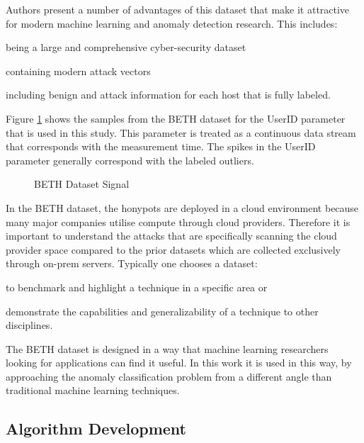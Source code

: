 Authors \cite{beth-dataset} present a number of advantages of this dataset that make it attractive for modern machine learning and anomaly detection research. This includes:
\begin{inlinelist}
    \item being a large and comprehensive cyber-security dataset
    \item containing modern attack vectors
    \item including benign and attack information for each host that is fully labeled.
\end{inlinelist}

Figure \ref{fig:beth_userid_all} shows the samples from the BETH dataset for the UserID parameter that is used in this study. This parameter is treated as a continuous data stream that corresponds with the measurement time. The spikes in the UserID parameter generally correspond with the labeled outliers.

\begin{figure}[H]
    
    \caption{BETH Dataset Signal}
    \label{fig:beth_userid_all}
\end{figure}

In the BETH dataset, the honypots are deployed in a cloud environment because many major companies utilise compute through cloud providers. Therefore it is important to understand the attacks that are specifically scanning the cloud provider space compared to the prior datasets which are collected exclusively through on-prem servers. Typically one chooses a dataset:
\begin{inlinelist}
    \item to benchmark and highlight a technique in a specific area or
    \item demonstrate the capabilities and generalizability of a technique to other disciplines.
\end{inlinelist}
The BETH dataset is designed in a way that machine learning researchers looking for applications can find it useful. In this work it is used in this way, by approaching the anomaly classification problem from a different angle than traditional machine learning techniques.

\subsection{Algorithm Development}

